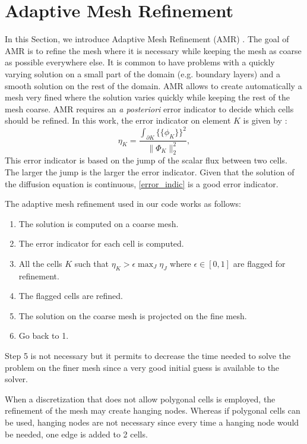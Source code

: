 \documentclass[preprint,10pt]{elsarticle}
\newcommand\ldb{\{\!\!\{}
\newcommand\rdb{\}\!\!\}}
\renewcommand{\(}{\left(}
\renewcommand{\)}{\right)}
\renewcommand{\[}{\left[}
\renewcommand{\]}{\right]}
\begin{document}
\section{Adaptive Mesh Refinement} \label{sec_amr}
In this Section, we introduce Adaptive Mesh Refinement (AMR)
\cite{Jessee1998,Wang2010a,Ragusa2010}. The goal of AMR is to refine the mesh
where it is necessary while keeping the mesh as coarse as possible everywhere
else. It is common to have problems with a quickly varying solution on a small
part of the domain (e.g. boundary layers) and a smooth solution on the rest of 
the domain. AMR allows to create automatically a mesh very fined where the
solution varies quickly while keeping the rest of the mesh coarse. AMR requires 
an \emph{a posteriori} error indicator to decide which cells should be refined. 
In this work, the error indicator on element $K$ is given by \cite{Wang2010a}:
\begin{equation}
  \eta_K = \frac{\int_{\partial K} \ldb\phi_K\rdb^2}{\|\Phi_K\|_2^2},
  \label{error_indic}
\end{equation}  
This error indicator is based on the jump of the scalar flux between
two cells. The larger the jump is the larger the error indicator. Given that
the solution of the diffusion equation is continuous, \cref{error_indic} is a
good error indicator. 

The adaptive mesh refinement used in our code works as follows:
\begin{enumerate}
  \item The solution is computed on a coarse mesh.
  \item The error indicator for each cell is computed.
  \item All the cells $K$ such that $\eta_K > \epsilon \max_{J} \eta_J$ where
    $\epsilon \in [0,1]$ are flagged for refinement.
  \item The flagged cells are refined.
  \item The solution on the coarse mesh is projected on the fine mesh.
  \item Go back to 1.
\end{enumerate}
Step 5 is not necessary but it permits to decrease the time needed to solve
the problem on the finer mesh since a very good initial guess is available to
the solver.

When a discretization that does not allow polygonal cells is employed, the
refinement of the mesh may create hanging nodes. Whereas if polygonal cells can
be used, hanging nodes are not necessary since every time a hanging node
would be needed, one edge is added to 2 cells.
\end{document}
